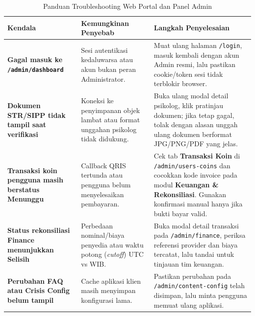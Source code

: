 \begin{table}[htbp]
  \centering
  \caption{Panduan Troubleshooting Web Portal dan Panel Admin}
  \label{tab:troubleshooting-web-admin}
  \small
  \begin{tabularx}{\textwidth}{@{}p{4.0cm}p{4.3cm}X@{}}
    \toprule
    \textbf{Kendala} & \textbf{Kemungkinan Penyebab} & \textbf{Langkah Penyelesaian} \\
    \midrule
    \textbf{Gagal masuk ke \texttt{/admin/dashboard}} & Sesi autentikasi kedaluwarsa atau akun bukan peran Administrator. & Muat ulang halaman \texttt{/login}, masuk kembali dengan akun Admin resmi, lalu pastikan cookie/token sesi tidak terblokir browser. \\
    \addlinespace[4pt]
    \textbf{Dokumen STR/SIPP tidak tampil saat verifikasi} & Koneksi ke penyimpanan objek lambat atau format unggahan psikolog tidak didukung. & Buka ulang modal detail psikolog, klik pratinjau dokumen; jika tetap gagal, tolak dengan alasan unggah ulang dokumen berformat JPG/PNG/PDF yang jelas. \\
    \addlinespace[4pt]
    \textbf{Transaksi koin pengguna masih berstatus Menunggu} & Callback QRIS tertunda atau pengguna belum menyelesaikan pembayaran. & Cek tab \textbf{Transaksi Koin} di \texttt{/admin/users-coins} dan cocokkan kode invoice pada modul \textbf{Keuangan \& Rekonsiliasi}. Gunakan konfirmasi manual hanya jika bukti bayar valid. \\
    \addlinespace[4pt]
    \textbf{Status rekonsiliasi Finance menunjukkan Selisih} & Perbedaan nominal/biaya penyedia atau waktu potong (\textit{cutoff}) UTC vs WIB. & Buka modal detail transaksi pada \texttt{/admin/finance}, periksa referensi provider dan biaya tercatat, lalu tandai untuk tinjauan tim keuangan. \\
    \addlinespace[4pt]
    \textbf{Perubahan FAQ atau Crisis Config belum tampil} & Cache aplikasi klien masih menyimpan konfigurasi lama. & Pastikan perubahan pada \texttt{/admin/content-config} telah disimpan, lalu minta pengguna memuat ulang aplikasi. \\
    \bottomrule
  \end{tabularx}
\end{table}
